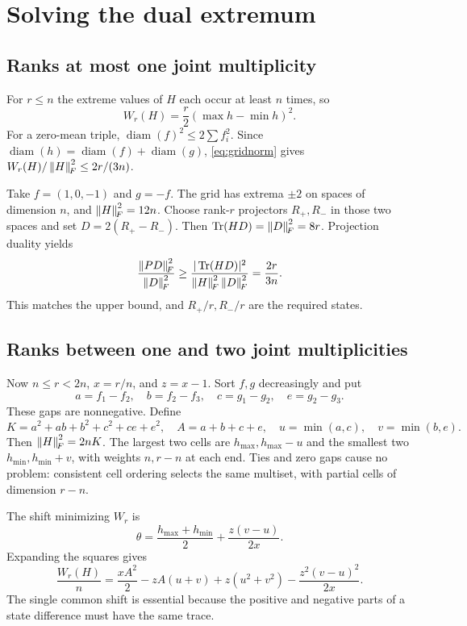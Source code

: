 \documentclass[11pt,a4paper]{article}
\theoremstyle{remark}\newtheorem{remark}[theorem]{Remark}
\begin{document}
\section{Solving the dual extremum}
\subsection{Ranks at most one joint multiplicity}
For $r\le n$ the extreme values of $H$ each occur at least $n$ times, so
\[
 W_r(H)=\frac r2(\max h-\min h)^2.
\]
For a zero-mean triple,
$\operatorname{diam}(f)^2\le2\sum f_i^2$. Since
$\operatorname{diam}(h)=\operatorname{diam}(f)+\operatorname{diam}(g)$,
\eqref{eq:gridnorm} gives $W_r(H)/\left\|H\right\|_{\!F}^2\le2r/(3n)$.

Take $f=(1,0,-1)$ and $g=-f$. The grid has extrema $\pm2$ on spaces
of dimension $n$, and $\left\|H\right\|_{\!F}^2=12n$. Choose rank-$r$ projectors
$R_+,R_-$ in those two spaces and set $D=2(R_+-R_-)$.
Then $\operatorname{Tr}(HD)=\left\|D\right\|_{\!F}^2=8r$. Projection duality yields
\[
 \frac{\left\|PD\right\|_{\!F}^2}{\left\|D\right\|_{\!F}^2}\ge
 \frac{|\operatorname{Tr}(HD)|^2}{\left\|H\right\|_{\!F}^2\left\|D\right\|_{\!F}^2}
 =\frac{2r}{3n}.
\]
This matches the upper bound, and $R_+/r,R_-/r$ are the required states.

\subsection{Ranks between one and two joint multiplicities}
Now $n\le r<2n$, $x=r/n$, and $z=x-1$. Sort $f,g$ decreasingly and put
\[
 a=f_1-f_2,\quad b=f_2-f_3,\quad c=g_1-g_2,\quad e=g_2-g_3.
\]
These gaps are nonnegative. Define
\[
 K=a^2+ab+b^2+c^2+ce+e^2,\quad
 A=a+b+c+e,\quad u=\min(a,c),\quad v=\min(b,e).
\]
Then $\left\|H\right\|_{\!F}^2=2nK$. The largest two cells are
$h_{\max},h_{\max}-u$ and the smallest two
$h_{\min},h_{\min}+v$, with weights $n,r-n$ at each end.
Ties and zero gaps cause no problem: consistent cell ordering selects
the same multiset, with partial cells of dimension $r-n$.

The shift minimizing $W_r$ is
\[
 \theta=\frac{h_{\max}+h_{\min}}2+\frac{z(v-u)}{2x}.
\]
Expanding the squares gives
\begin{equation}\label{eq:Q}
 \frac{W_r(H)}n=
 \frac{xA^2}2-zA(u+v)+z(u^2+v^2)-\frac{z^2(v-u)^2}{2x}.
\end{equation}
The single common shift is essential because the positive and negative
parts of a state difference must have the same trace.
\end{document}
